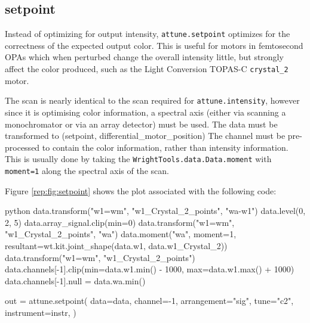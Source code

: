 \hypertarget{setpoint}{%
\subsection{setpoint}\label{setpoint}}

Instead of optimizing for output intensity,
\texttt{attune.setpoint} optimizes for the correctness
of the expected output color. This is useful for motors in femtosecond
OPAs which when perturbed change the overall intensity little, but
strongly affect the color produced, such as the Light Conversion TOPAS-C
\texttt{crystal\_2} motor.

The scan is nearly identical to the scan required for
\texttt{attune.intensity}, however since it is
optimising color information, a spectral axis (either via scanning a
monochromator or via an array detector) must be used. The data must be
transformed to (setpoint, differential\_motor\_position) The channel
must be pre-processed to contain the color information, rather than
intensity information. This is usually done by taking the
\texttt{WrightTools.data.Data.moment} with \texttt{moment=1} along the
spectral axis of the scan.

Figure \ref{rep:fig:setpoint} shows the plot associated with the following code:

\begin{codefragment}{python}
data.transform("w1=wm", "w1_Crystal_2_points", "wa-w1")
data.level(0, 2, 5)
data.array_signal.clip(min=0)
data.transform("w1=wm", "w1_Crystal_2_points", "wa")
data.moment("wa", moment=1, resultant=wt.kit.joint_shape(data.w1, data.w1_Crystal_2))
data.transform("w1=wm", "w1_Crystal_2_points")
data.channels[-1].clip(min=data.w1.min() - 1000, max=data.w1.max() + 1000)
data.channels[-1].null = data.wa.min()

out = attune.setpoint(
    data=data,
    channel=-1,
    arrangement="sig",
    tune="c2",
    instrument=instr,
)
\end{codefragment}

